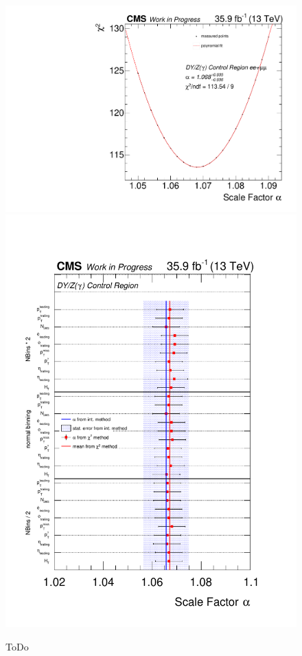 \begin{figure}[tbp]
 \centering
 \includegraphics[width=\pairwidth]{figures/plots_CR/chi/DY_LL_met}
 \includegraphics[width=\pairwidth]{figures/plots_CR/chi/DY_CompareLL}
 \caption{ToDo}
 \label{fig:chiDY}
\end{figure}


